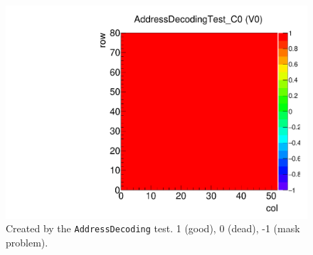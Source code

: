 \begin{figure}[!Hp]
\centering
\begin{minipage}{0.45\textwidth}
  \includegraphics[width=1.0\textwidth]{figures/alive_AddressDecodingTest.pdf}
  \caption{Created by the {\tt AddressDecoding} test.
  1 (good), 0 (dead), -1 (mask problem).}
  \label{fig:alive_AddressDecodingTest}
\end{minipage}
\end{figure}
